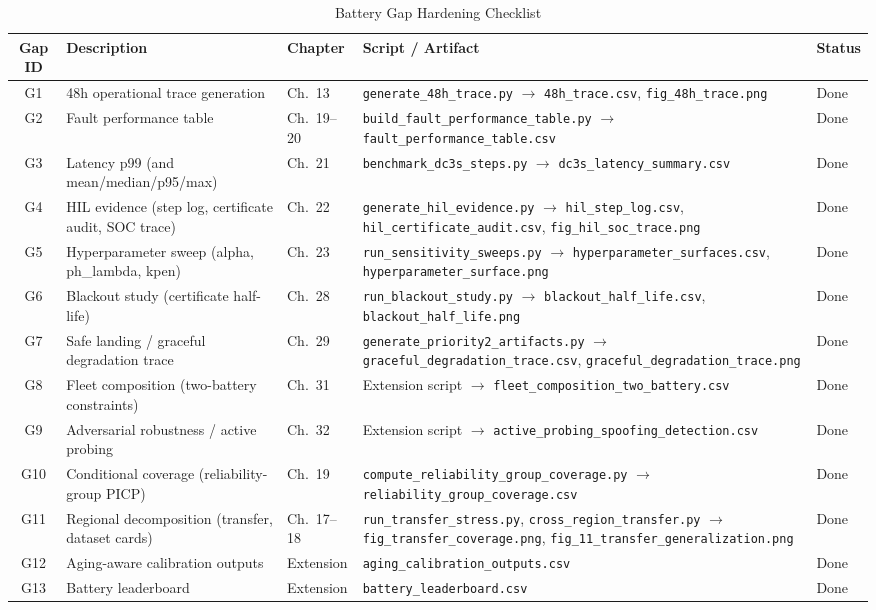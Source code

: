 \begin{table}[htbp]
\centering
\caption{Battery Gap Hardening Checklist}
\label{tab:gap-hardening}
\small
\begin{tabular}{@{}clp{3.2cm}ll@{}}
\toprule
\textbf{Gap ID} & \textbf{Description} & \textbf{Chapter} & \textbf{Script / Artifact} & \textbf{Status} \\
\midrule
G1 & 48h operational trace generation & Ch.\ 13 & \texttt{generate\_48h\_trace.py} $\rightarrow$ \texttt{48h\_trace.csv}, \texttt{fig\_48h\_trace.png} & Done \\
G2 & Fault performance table & Ch.\ 19--20 & \texttt{build\_fault\_performance\_table.py} $\rightarrow$ \texttt{fault\_performance\_table.csv} & Done \\
G3 & Latency p99 (and mean/median/p95/max) & Ch.\ 21 & \texttt{benchmark\_dc3s\_steps.py} $\rightarrow$ \texttt{dc3s\_latency\_summary.csv} & Done \\
G4 & HIL evidence (step log, certificate audit, SOC trace) & Ch.\ 22 & \texttt{generate\_hil\_evidence.py} $\rightarrow$ \texttt{hil\_step\_log.csv}, \texttt{hil\_certificate\_audit.csv}, \texttt{fig\_hil\_soc\_trace.png} & Done \\
G5 & Hyperparameter sweep (alpha, ph\_lambda, kpen) & Ch.\ 23 & \texttt{run\_sensitivity\_sweeps.py} $\rightarrow$ \texttt{hyperparameter\_surfaces.csv}, \texttt{hyperparameter\_surface.png} & Done \\
G6 & Blackout study (certificate half-life) & Ch.\ 28 & \texttt{run\_blackout\_study.py} $\rightarrow$ \texttt{blackout\_half\_life.csv}, \texttt{blackout\_half\_life.png} & Done \\
G7 & Safe landing / graceful degradation trace & Ch.\ 29 & \texttt{generate\_priority2\_artifacts.py} $\rightarrow$ \texttt{graceful\_degradation\_trace.csv}, \texttt{graceful\_degradation\_trace.png} & Done \\
G8 & Fleet composition (two-battery constraints) & Ch.\ 31 & Extension script $\rightarrow$ \texttt{fleet\_composition\_two\_battery.csv} & Done \\
G9 & Adversarial robustness / active probing & Ch.\ 32 & Extension script $\rightarrow$ \texttt{active\_probing\_spoofing\_detection.csv} & Done \\
G10 & Conditional coverage (reliability-group PICP) & Ch.\ 19 & \texttt{compute\_reliability\_group\_coverage.py} $\rightarrow$ \texttt{reliability\_group\_coverage.csv} & Done \\
G11 & Regional decomposition (transfer, dataset cards) & Ch.\ 17--18 & \texttt{run\_transfer\_stress.py}, \texttt{cross\_region\_transfer.py} $\rightarrow$ \texttt{fig\_transfer\_coverage.png}, \texttt{fig\_11\_transfer\_generalization.png} & Done \\
G12 & Aging-aware calibration outputs & Extension & \texttt{aging\_calibration\_outputs.csv} & Done \\
G13 & Battery leaderboard & Extension & \texttt{battery\_leaderboard.csv} & Done \\
\bottomrule
\end{tabular}
\end{table}

